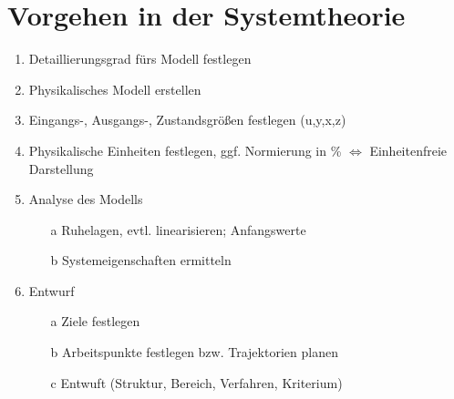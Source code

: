 \section*{Vorgehen in der Systemtheorie}
\begin{enumerate}
    \item Detaillierungsgrad fürs Modell festlegen
    \item Physikalisches Modell erstellen
    \item Eingangs-, Ausgangs-, Zustandsgrößen festlegen (u,y,x,z)
    \item Physikalische Einheiten festlegen, ggf. Normierung in \% $\Longleftrightarrow$ Einheitenfreie Darstellung
    \item Analyse des Modells
    \begin{itemize}
        \item [a] Ruhelagen, evtl. linearisieren; Anfangswerte
        \item [b] Systemeigenschaften ermitteln
    \end{itemize}
    \item Entwurf
    \begin{itemize}
        \item [a] Ziele festlegen
        \item [b] Arbeitspunkte festlegen bzw. Trajektorien planen
        \item [c] Entwuft (Struktur, Bereich, Verfahren, Kriterium)
        \end{itemize}
\end{enumerate}